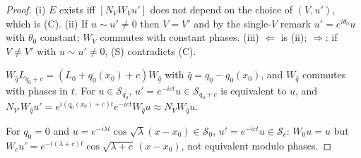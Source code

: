 \begin{proof}
(i) $E$ exists iff $[N_VW_Vu']$ does not depend on the choice of $(V,u')$, which is (C). (ii) If $u\sim u'\ne0$ then $V=V'$ and by the single-$V$ remark $u'=e^{i\theta_0}u$ with $\theta_0$ constant; $W_V$ commutes with constant phases. (iii) $\Leftarrow$ is (ii); $\Rightarrow$: if $V\ne V'$ with $u\sim u'\ne0$, (S) contradicts (C).

$W_{\hat q}L_{q_0+c}=(L_0+q_0(x_0)+c)W_{\hat q}$ with $\hat q=q_0-q_0(x_0)$, and $W_{\hat q}$ commutes with phases in $t$. For $u\in\mathcal S_{q_0}$, $u'=e^{-ict}u\in\mathcal S_{q_0+c}$ is equivalent to $u$, and $N_{V'}W_{\hat q}u'=e^{i(q_0(x_0)+c)t}e^{-ict}W_{\hat q}u\approx N_VW_{\hat q}u$.

For $q_0=0$ and $u=e^{-i\lambda t}\cos\sqrt\lambda(x-x_0)\in\mathcal S_0$, $u'=e^{-ict}u\in\mathcal S_c$: $W_0u=u$ but $W_cu'=e^{-i(\lambda+c)t}\cos\sqrt{\lambda+c}\,(x-x_0)$, not equivalent modulo phases.

\end{proof}
